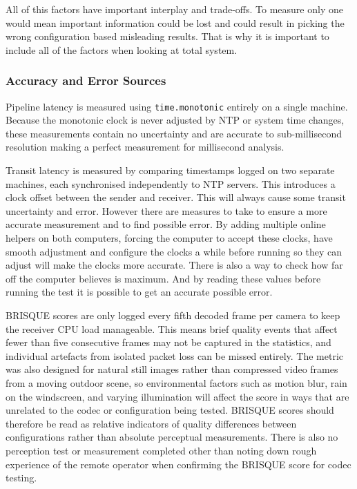 All of this factors have important interplay and trade-offs. To measure only one would mean important information could be lost and could result in picking the wrong configuration based misleading results. That is why it is important to include all of the factors when looking at total system.

\subsubsection{Accuracy and Error Sources}

Pipeline latency is measured using \texttt{time.monotonic} entirely on a single machine. Because the monotonic clock is never adjusted by NTP or system time changes, these measurements contain no uncertainty and are accurate to sub-millisecond resolution making a perfect measurement for millisecond analysis.

Transit latency is measured by comparing timestamps logged on two separate machines, each synchronised independently to NTP servers. This introduces a clock offset between the sender and receiver. This will always cause some transit uncertainty and error. However there are measures to take to ensure a more accurate measurement and to find possible error. By adding multiple online helpers on both computers, forcing the computer to accept these clocks, have smooth adjustment and configure the clocks a while before running so they can adjust will make the clocks more accurate. There is also a way to check how far off the computer believes is maximum. And by reading these values before running the test it is possible to get an accurate possible error.

BRISQUE scores are only logged every fifth decoded frame per camera to keep the receiver CPU load manageable. This means brief quality events that affect fewer than five consecutive frames may not be captured in the statistics, and individual artefacts from isolated packet loss can be missed entirely. The metric was also designed for natural still images rather than compressed video frames from a moving outdoor scene, so environmental factors such as motion blur, rain on the windscreen, and varying illumination will affect the score in ways that are unrelated to the codec or configuration being tested. BRISQUE scores should therefore be read as relative indicators of quality differences between configurations rather than absolute perceptual measurements. There is also no perception test or measurement completed other than noting down rough experience of the remote operator when confirming the BRISQUE score for codec testing.

